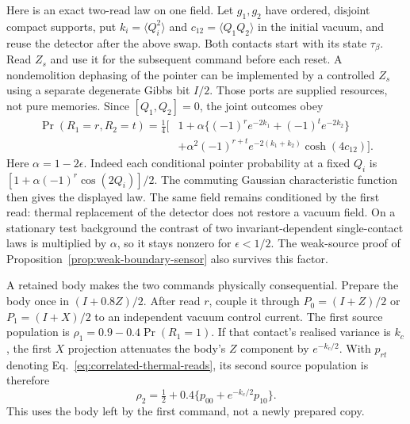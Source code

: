 \documentclass[12pt,a4paper]{article}
\begin{document}
Here is an exact two-read law on one field. Let $g_1,g_2$ have ordered,
disjoint compact supports, put $k_i=\langle Q_i^2\rangle$ and
$c_{12}=\langle Q_1Q_2\rangle$ in the initial vacuum, and reuse the detector
after the above swap. Both contacts start with its state $\tau_\beta$.
Read $Z_s$ and use it for the subsequent command before each reset.
A nondemolition dephasing of the pointer can be implemented by a controlled
$Z_s$ using a separate degenerate Gibbs bit $I/2$. Those ports are supplied
resources, not pure memories. Since $[Q_1,Q_2]=0$, the joint outcomes obey
\begin{equation}\label{eq:correlated-thermal-reads}
\begin{split}
 \Pr(R_1=r,R_2=t)=\frac14\bigl[&
 1+\alpha\{(-1)^re^{-2k_1}+(-1)^te^{-2k_2}\}\\
 &+\alpha^2(-1)^{r+t}e^{-2(k_1+k_2)}\cosh(4c_{12})\bigr].
\end{split}
\end{equation}
Here $\alpha=1-2\epsilon$.
Indeed each conditional pointer probability at a fixed $Q_i$ is
$[1+\alpha(-1)^r\cos(2Q_i)]/2$.
The commuting Gaussian characteristic function then gives the displayed law.
The same field remains conditioned by the first read: thermal replacement of
the detector does not restore a vacuum field. On a stationary test background
the contrast of two invariant-dependent single-contact laws is multiplied
by $\alpha$, so it stays nonzero for $\epsilon<1/2$.
The weak-source proof of Proposition~\ref{prop:weak-boundary-sensor}
also survives this factor.

A retained body makes the two commands physically consequential.
Prepare the body once in $(I+0.8Z)/2$. After read $r$, couple it through
$P_0=(I+Z)/2$ or $P_1=(I+X)/2$ to an independent vacuum control current.
The first source population is $\rho_1=0.9-0.4\Pr(R_1=1)$.
If that contact's realised variance is $k_c$, the first $X$ projection
attenuates the body's $Z$ component by $e^{-k_c/2}$.
With $p_{rt}$ denoting Eq.~\eqref{eq:correlated-thermal-reads}, its second
source population is therefore
\begin{equation}\label{eq:held-body-second-source}
 \rho_2=\tfrac12+0.4\{p_{00}+e^{-k_c/2}p_{10}\}.
\end{equation}
This uses the body left by the first command, not a newly prepared copy.
\end{document}
